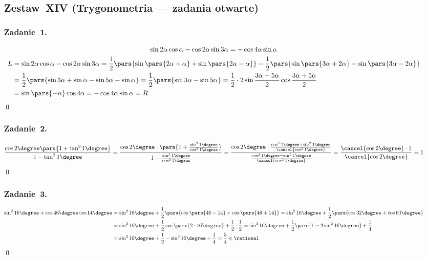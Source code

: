 \subsection*{Zestaw~XIV (Trygonometria --- zadania otwarte)}
\subsubsection*{Zadanie~1.}
\begin{gather*}
    \sin2\alpha\cos\alpha - \cos2\alpha\sin3\alpha = -\cos4\alpha\sin\alpha\\
    \begin{split}
        L
            &= \sin2\alpha\cos\alpha - \cos2\alpha\sin3\alpha
            = \frac{1}{2}\pars{\sin\pars{2\alpha + \alpha} + \sin\pars{2\alpha - \alpha}} - \frac{1}{2}\pars{\sin\pars{3\alpha + 2\alpha} + \sin\pars{3\alpha - 2\alpha}}\\
            &= \frac{1}{2}\pars{\sin3\alpha + \sin\alpha - \sin5\alpha - \sin\alpha}
            = \frac{1}{2}\pars{\sin3\alpha - \sin5\alpha}
            = \frac{1}{2} \cdot 2\sin\frac{3\alpha - 5\alpha}{2}\cos\frac{3\alpha + 5\alpha}{2}\\
            &= \sin\pars{-\alpha}\cos4\alpha
            = -\cos4\alpha\sin\alpha = R
    \end{split}
\end{gather*}
\qed
\subsubsection*{Zadanie~2.}
\begin{equation*}
        \frac{\cos2\degree\pars{1 + \tan^21\degree}}{1 - \tan^21\degree}
            = \frac{\cos2\degree \cdot \pars{1 + \frac{\sin^21\degree}{\cos^21\degree}}}{1 - \frac{\sin^21\degree}{\cos^21\degree}}
            = \frac{\cos2\degree \cdot \frac{\cos^21\degree + \sin^21\degree}{\cancel{\cos^21\degree}}}{\frac{\cos^21\degree - \sin^21\degree}{\cancel{\cos^21\degree}}}
            = \frac{\cancel{\cos2\degree} \cdot 1}{\cancel{\cos2\degree}}
            = 1
\end{equation*}
\qed
\subsubsection*{Zadanie~3.}
\begin{equation*}
    \begin{split}
        \sin^216\degree + \cos46\degree\cos14\degree
            &= \sin^216\degree + \frac{1}{2}\pars{\cos\pars{46 - 14} + \cos\pars{46 + 14}}
            = \sin^216\degree + \frac{1}{2}\pars{\cos32\degree + \cos60\degree}\\
            &= \sin^216\degree + \frac{1}{2}\cos\pars{2 \cdot 16\degree} + \frac{1}{2} \cdot \frac{1}{2}
            = \sin^216\degree + \frac{1}{2}\pars{1 - 2\sin^216\degree} + \frac{1}{4}\\
            &= \sin^216\degree + \frac{1}{2} - \sin^216\degree + \frac{1}{4}
            = \frac{3}{4} \in \rational
    \end{split}
\end{equation*}
\qed
